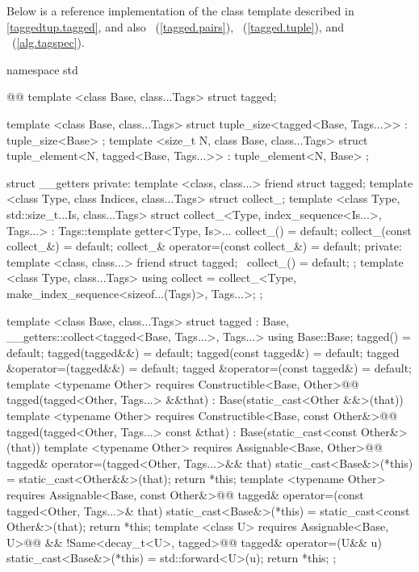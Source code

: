 
\pnum Below is a reference implementation of the  class template described in
\ref{taggedtup.tagged}, and also ~(\ref{tagged.pairs}),
~(\ref{tagged.tuple}), and ~(\ref{alg.tagspec}).

\begin{codeblock}
namespace std { @@
  template <class Base, class...Tags>
  struct tagged;

  template <class Base, class...Tags>
  struct tuple_size<tagged<Base, Tags...>>
    : tuple_size<Base> { };
  template <size_t N, class Base, class...Tags>
  struct tuple_element<N, tagged<Base, Tags...>>
    : tuple_element<N, Base> { };

  struct __getters {
  private:
    template <class, class...> friend struct tagged;
    template <class Type, class Indices, class...Tags>
    struct collect_;
    template <class Type, std::size_t...Is, class...Tags>
    struct collect_<Type, index_sequence<Is...>, Tags...>
      : Tags::template getter<Type, Is>... {
      collect_() = default;
      collect_(const collect_&) = default;
      collect_& operator=(const collect_&) = default;
    private:
      template <class, class...> friend struct tagged;
      ~collect_() = default;
    };
    template <class Type, class...Tags>
    using collect = collect_<Type, make_index_sequence<sizeof...(Tags)>, Tags...>;
  };

  template <class Base, class...Tags>
  struct tagged
    : Base, __getters::collect<tagged<Base, Tags...>, Tags...> {
    using Base::Base;
    tagged() = default;
    tagged(tagged&&) = default;
    tagged(const tagged&) = default;
    tagged &operator=(tagged&&) = default;
    tagged &operator=(const tagged&) = default;
    template <typename Other>
      requires Constructible<Base, Other>@\newtxt{()}@
    tagged(tagged<Other, Tags...> &&that)
      : Base(static_cast<Other &&>(that)) { }
    template <typename Other>
      requires Constructible<Base, const Other&>@\newtxt{()}@
    tagged(tagged<Other, Tags...> const &that)
      : Base(static_cast<const Other&>(that)) { }
    template <typename Other>
      requires Assignable<Base, Other>@\newtxt{()}@
    tagged& operator=(tagged<Other, Tags...>&& that) {
      static_cast<Base&>(*this) = static_cast<Other&&>(that);
      return *this;
    }
    template <typename Other>
      requires Assignable<Base, const Other&>@\newtxt{()}@
    tagged& operator=(const tagged<Other, Tags...>& that) {
      static_cast<Base&>(*this) = static_cast<const Other&>(that);
      return *this;
    }
    template <class U>
      requires Assignable<Base, U>@\newtxt{()}@ && !Same<decay_t<U>, tagged>@\newtxt{()}@
    tagged& operator=(U&& u) {
      static_cast<Base&>(*this) = std::forward<U>(u);
      return *this;
    }
  };

}
\end{codeblock}
